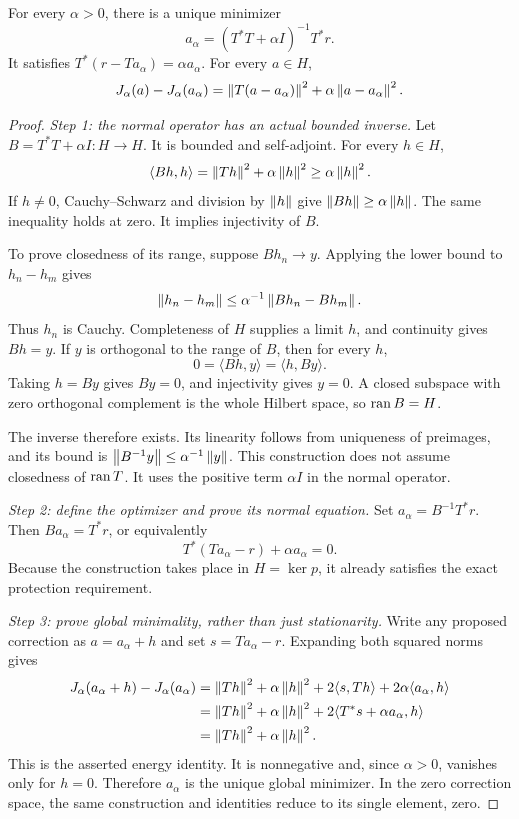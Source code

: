 \begin{KStheorem}\label{KS:WR06}
For every $\alpha>0$, there is a unique minimizer
\[
 a_\alpha=(T^*T+\alpha I)^{-1}T^*r.
\]
It satisfies $T^*(r-Ta_\alpha)=\alpha a_\alpha$. For every $a\in H$,
\begin{equation}\label{KS:eq:regularization-energy}
 J_\alpha(a)-J_\alpha(a_\alpha)
 =\left\lVert T(a-a_\alpha)\right\rVert^2+\alpha\left\lVert a-a_\alpha\right\rVert^2.
\end{equation}
\end{KStheorem}
\begin{proof}
\emph{Step 1: the normal operator has an actual bounded inverse.} Let $B=T^*T+\alpha I:H\to H$. It is bounded and self-adjoint. For every $h\in H$,
\[
 \langle Bh,h\rangle=\left\lVert Th\right\rVert^2+\alpha\left\lVert h\right\rVert^2
 \ge\alpha\left\lVert h\right\rVert^2.
\]
If $h\ne0$, Cauchy--Schwarz and division by $\left\lVert h\right\rVert$ give $\left\lVert Bh\right\rVert\ge\alpha\left\lVert h\right\rVert$. The same inequality holds at zero. It implies injectivity of $B$.

To prove closedness of its range, suppose $Bh_n\to y$. Applying the lower bound to $h_n-h_m$ gives
\[
 \left\lVert h_n-h_m\right\rVert\le\alpha^{-1}\left\lVert Bh_n-Bh_m\right\rVert.
\]
Thus $h_n$ is Cauchy. Completeness of $H$ supplies a limit $h$, and continuity gives $Bh=y$. If $y$ is orthogonal to the range of $B$, then for every $h$,
\[
 0=\langle Bh,y\rangle=\langle h,By\rangle.
\]
Taking $h=By$ gives $By=0$, and injectivity gives $y=0$. A closed subspace with zero orthogonal complement is the whole Hilbert space, so $\operatorname{ran} B=H$.

The inverse therefore exists. Its linearity follows from uniqueness of preimages, and its bound is $\left\lVert B^{-1}y\right\rVert\le\alpha^{-1}\left\lVert y\right\rVert$. This construction does not assume closedness of $\operatorname{ran} T$. It uses the positive term $\alpha I$ in the normal operator.

\emph{Step 2: define the optimizer and prove its normal equation.} Set $a_\alpha=B^{-1}T^*r$. Then $Ba_\alpha=T^*r$, or equivalently
\[
 T^*(Ta_\alpha-r)+\alpha a_\alpha=0.
\]
Because the construction takes place in $H=\ker p$, it already satisfies the exact protection requirement.

\emph{Step 3: prove global minimality, rather than just stationarity.} Write any proposed correction as $a=a_\alpha+h$ and set $s=Ta_\alpha-r$. Expanding both squared norms gives
\[
\begin{aligned}
 J_\alpha(a_\alpha+h)-J_\alpha(a_\alpha)
 &=\left\lVert Th\right\rVert^2+\alpha\left\lVert h\right\rVert^2
     +2\langle s,Th\rangle+2\alpha\langle a_\alpha,h\rangle\\
 &=\left\lVert Th\right\rVert^2+\alpha\left\lVert h\right\rVert^2
     +2\langle T^*s+\alpha a_\alpha,h\rangle\\
 &=\left\lVert Th\right\rVert^2+\alpha\left\lVert h\right\rVert^2.
\end{aligned}
\]
This is the asserted energy identity. It is nonnegative and, since $\alpha>0$, vanishes only for $h=0$. Therefore $a_\alpha$ is the unique global minimizer. In the zero correction space, the same construction and identities reduce to its single element, zero.
\end{proof}

